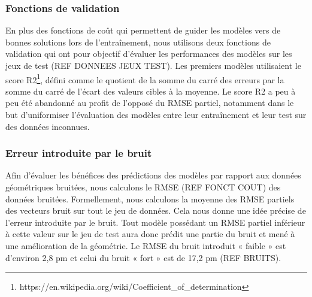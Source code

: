 \subsubsection{Fonctions de validation}

\par En plus des fonctions de coût qui permettent de guider les modèles vers de bonnes solutions lors de l'entraînement, nous utilisons deux fonctions de validation qui ont pour objectif d'évaluer les performances des modèles sur les jeux de test (REF DONNEES JEUX TEST). Les premiers modèles utilisaient le score R2\footnote{https://en.wikipedia.org/wiki/Coefficient\_of\_determination}, défini comme le quotient de la somme du carré des erreurs par la somme du carré de l'écart des valeurs cibles à la moyenne. Le score R2 a peu à peu été abandonné au profit de l'opposé du RMSE partiel, notamment dans le but d'uniformiser l'évaluation des modèles entre leur entraînement et leur test sur des données inconnues.

\subsubsection{Erreur introduite par le bruit}

\par Afin d'évaluer les bénéfices des prédictions des modèles par rapport aux données géométriques bruitées, nous calculons le RMSE (REF FONCT COUT) des données bruitées. Formellement, nous calculons la moyenne des RMSE partiels des vecteurs bruit sur tout le jeu de données. Cela nous donne une idée précise de l'erreur introduite par le bruit. Tout modèle possédant un RMSE partiel inférieur à cette valeur sur le jeu de test aura donc prédit une partie du bruit et mené à une amélioration de la géométrie. Le RMSE du bruit introduit « faible » est d'environ 2,8 pm et celui du bruit « fort » est de 17,2 pm (REF BRUITS).	